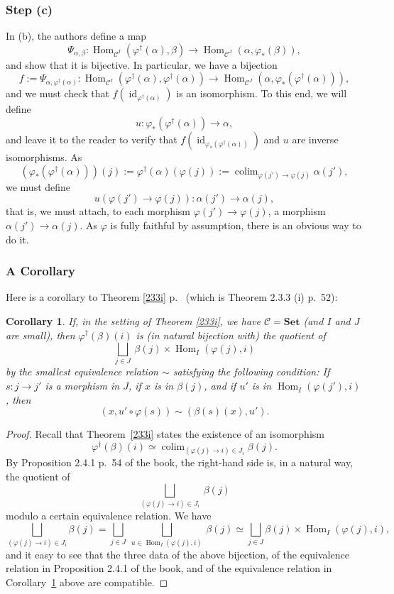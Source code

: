 \documentclass[12pt]{article}%
\newtheorem{cor}[thm]{Corollary}
\theoremstyle{remark}
\theoremstyle{definition}
\newcommand{\C}{\mathcal C}
\newcommand{\Set}{\mathbf{Set}}
\newcommand{\pp}{\varphi}
\DeclareMathOperator*{\colim}{colim}
\DeclareMathOperator{\id}{id}
\DeclareMathOperator{\Hom}{Hom}%
\begin{document}
\subsubsection{Step (c)}
%
In (b), the authors define a map 
%
\begin{equation}\label{e233i} 
%
\Psi_{\alpha,\beta}:
\Hom_{\C^I}(\varphi^\dagger(\alpha),\beta)\to
\Hom_{\C^J}(\alpha,\varphi_*(\beta)),
%
\end{equation} 
%
and show that it is bijective. In particular, we have a bijection 
$$
f:=\Psi_{\alpha,\varphi^\dagger(\alpha)}:
\Hom_{\C^I}(\varphi^\dagger(\alpha),\varphi^\dagger(\alpha))\to
\Hom_{\C^J}(\alpha,\varphi_*(\varphi^\dagger(\alpha))),
$$
and we must check that $f(\id_{\varphi^\dagger(\alpha)})$ is an isomorphism. To this end, we will define 
$$
u:\varphi_*(\varphi^\dagger(\alpha))\to\alpha,
$$
and leave it to the reader to verify that $f(\id_{\varphi_*(\varphi^\dagger(\alpha))})$ and $u$ are inverse isomorphisms. As 
$$ 
(\varphi_*(\varphi^\dagger(\alpha)))(j):=\varphi^\dagger(\alpha)(\varphi(j)):=\colim_{\varphi(j')\to\varphi(j)}\alpha(j'),
$$
we must define 
$$
u(\varphi(j')\to\varphi(j)):\alpha(j')\to\alpha(j),
$$
that is, we must attach, to each morphism $\varphi(j')\to\varphi(j)$, a morphism $\alpha(j')\to\alpha(j)$. As $\varphi$ is fully faithful by assumption, there is an obvious way to do it.


\subsubsection{A Corollary}

Here is a corollary to Theorem \ref{233i} p.~\pageref{233i} (which is Theorem 2.3.3 (i) p.~52):

\begin{cor}\label{c233i}
If, in the setting of Theorem \ref{233i}, we have $\C=\Set$ (and $I$ and $J$ are small), then $\varphi^\dagger(\beta)(i)$ is (in natural bijection with) the quotient of 
$$
\bigsqcup_{j\in J}\ \beta(j)\times\Hom_I(\varphi(j),i) 
$$ 
by the smallest equivalence relation $\sim$ satisfying the following condition: If $s:j\to j'$ is a morphism in $J$, if $x$ is in $\beta(j)$, and if $u'$ is in $\Hom_I(\varphi(j'),i)$, then 
$$
(x,u'\circ\varphi(s))\sim(\beta(s)(x),u'). 
$$
\end{cor}

\begin{proof}
Recall that Theorem~\ref{233i} states the existence of an isomorphism 
$$
\varphi^\dagger(\beta)(i)\simeq\colim_{(\varphi(j)\to i)\in J_i}\beta(j).
$$
By Proposition 2.4.1 p.~54 of the book, the right-hand side is, in a natural way, the quotient of 
$$
\bigsqcup_{(\pp(j)\to i)\in J_i}\ \beta(j)
$$ 
modulo a certain equivalence relation. We have 
$$
\bigsqcup_{(\pp(j)\to i)\in J_i}\beta(j)=\bigsqcup_{j\in J}\ \bigsqcup_{u\in\Hom_I(\varphi(j),i)}\ \beta(j)\simeq\bigsqcup_{j\in J}\beta(j)\times\Hom_I(\varphi(j),i),
$$ 
and it easy to see that the three data of the above bijection, of the equivalence relation in Proposition 2.4.1 of the book, and of the equivalence relation in Corollary~\ref{c233i} above are compatible.
\end{proof}
\end{document}
